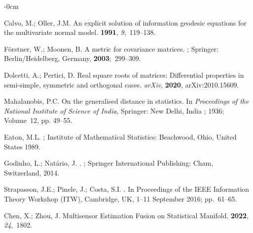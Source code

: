 \documentclass[entropy,article,accept,oneauthor,pdftex,entropy]{Definitions/mdpi}
\begin{document}
\begin{adjustwidth}{-\extralength}{0cm}
\begin{thebibliography}{999}
Calvo, M.; Oller, J.M.
\newblock An explicit solution of information geodesic equations for the
  multivariate normal model.
 {\bf 1991}, {\em 9},~119--138.

F{\"o}rstner, W.; Moonen, B.
\newblock A metric for covariance matrices.
; Springer: Berlin/Heidelberg, Germany, {\bf 2003};~299--309.




Dolcetti, A.; Pertici, D.
\newblock Real square roots of matrices: Differential properties in
  semi-simple, symmetric and orthogonal cases.
\newblock 
 \emph{arXiv}, \textbf{2020}, {arXiv}:2010.15609.

Mahalanobis, P.C.
\newblock On the generalised distance in statistics.
\newblock In \emph{Proceedings of the National Institute of
  Science of India},  Springer: New Delhi, India ; {1936;} %
 Volume~12, pp. 49--55.

Eaton, M.L.
; {Institute of
  Mathematical Statistics: Beachwood, Ohio, United States} %
  1989.

 

Godinho, L.; Nat{\'a}rio, J.
.
; Springer International Publishing: Cham, Switzerland, {2014}.

 

Strapasson, J.E.; Pinele, J.; Costa, S.I.
.
\newblock In Proceedings of the IEEE Information Theory Workshop (ITW), {Cambridge, UK, 1--11 September 2016;}
  \mbox{pp. 61--65.}

Chen, X.; Zhou, J.
\newblock Multisensor Estimation Fusion on Statistical Manifold.
 {\bf 2022}, {\em 24},~1802.


\end{thebibliography}
\end{adjustwidth}
\end{document}
